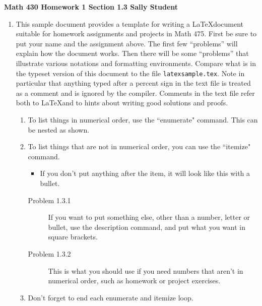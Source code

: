 \documentclass{article} %
\begin{document}
{\large \bf Math 430 Homework 1 Section 1.3 \hfill Sally Student}
\vspace{.2in} %

\begin{enumerate} %
\item %
This sample document provides a template for writing a \LaTeX document suitable for homework assignments and projects in Math 475. First be sure to put your name and the assignment above.   The first few ``problems'' %
will explain how the document works.  Then there will be some ``problems'' that illustrate various notations and formatting environments.  Compare what is in the typeset version of this document to the file {\tt latexsample.tex}.  Note in particular that anything typed after a percent sign in the text file is treated as a comment and is ignored by the compiler.  Comments in the text file refer both to \LaTeX and to hints about writing good solutions and proofs. 
	\begin{enumerate} %
		\item To list things in numerical order, use the ``enumerate" command.  This can be nested as shown.
		\item To list things that are not in numerical order, you can use the ``itemize" command.
			\begin{itemize}
				\item If you don't put anything after the item, it will look like this with a bullet.
			\end{itemize}
			\begin{description}
				\item[Problem 1.3.1] If you want to put something else, other than a number, letter or bullet, use the description command, and put what you want in square brackets.	
				\item[Problem 1.3.2] This is what you should use if you need numbers that aren't in numerical order, such as homework or project exercises.
			\end{description}
		\item Don't forget to end each enumerate and itemize loop.


\end{enumerate}
\end{enumerate}
\end{document}
